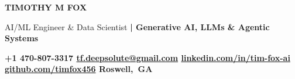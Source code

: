 \documentclass[10pt,letterpaper]{article}
\begin{document}
{\color{black}\fontsize{30}{34}\selectfont\bfseries TIMOTHY M FOX}\par
\vspace{4pt}
{\color{accent}\fontsize{14}{16}\selectfont
  AI/ML Engineer \& Data Scientist \textbf{| Generative AI, LLMs \& Agentic Systems}}\par
\vspace{6pt}
{\small\bfseries\color{meta}%
  {\color{accent}\faPhone*}\hspace{4pt}+1 470-807-3317\hspace{8pt}
  {\color{accent}\faAt}\hspace{4pt}\href{mailto:tf.deepsolute@gmail.com}{tf.deepsolute@gmail.com}\hspace{8pt}
  {\color{accent}\faLink}\hspace{4pt}\href{https://www.linkedin.com/in/tim-fox-ai}{linkedin.com/in/tim-fox-ai}\hspace{8pt}
  {\color{accent}\faGithub}\hspace{4pt}\href{https://github.com/timfox456}{github.com/timfox456}\hspace{8pt}
  \mbox{{\color{accent}\faMapMarker*}\hspace{4pt}Roswell, GA}}\par
\vspace{2pt}
\end{document}
